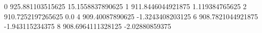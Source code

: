 0 925.881103515625 15.1558837890625
1 911.8446044921875 1.119384765625
2 910.7252197265625 0.0
4 909.40087890625 -1.3243408203125
6 908.7821044921875 -1.943115234375
8 908.6964111328125 -2.02880859375
